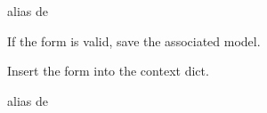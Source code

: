 \documentclass[letterpaper,10pt,spanish]{sphinxmanual}
\begin{document}
\begin{fulllineitems}

\pysigstartsignatures
{}
\pysigstopsignatures

\begin{fulllineitems}

\pysigstartsignatures
{}
\pysigstopsignatures
\sphinxAtStartPar
alias de 

\end{fulllineitems}



\begin{fulllineitems}

\pysigstartsignatures
{}
\pysigstopsignatures
\sphinxAtStartPar
If the form is valid, save the associated model.

\end{fulllineitems}



\begin{fulllineitems}

\pysigstartsignatures
{}
\pysigstopsignatures
\sphinxAtStartPar
Insert the form into the context dict.

\end{fulllineitems}



\begin{fulllineitems}

\pysigstartsignatures
{}
\pysigstopsignatures
\sphinxAtStartPar
alias de 

\end{fulllineitems}



\begin{fulllineitems}

\pysigstartsignatures
{}
\pysigstopsignatures
\end{fulllineitems}



\begin{fulllineitems}

\pysigstartsignatures
{}
\pysigstopsignatures
\end{fulllineitems}


\end{fulllineitems}
\end{document}
